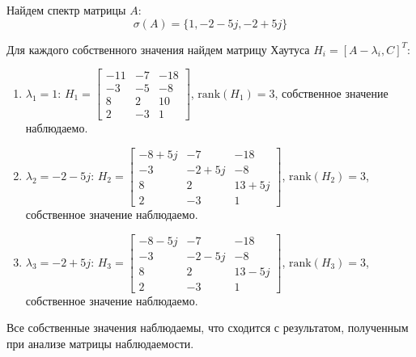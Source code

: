 Найдем спектр матрицы $A$:
\begin{equation}
    \sigma(A) = \{1, -2-5j, -2+5j\}
\end{equation}

Для каждого собственного значения найдем матрицу Хаутуса $H_i = [A - \lambda_i, C]^T$:
\begin{enumerate}
    \item $\lambda_1 = 1$: $H_1 = \begin{bmatrix}
        -11 & -7 & -18 \\
        -3 & -5 & -8 \\
        8 & 2 & 10 \\
        2 & -3 & 1
    \end{bmatrix}$, $\text{rank}(H_1) = 3$, собственное значение наблюдаемо.
    \item $\lambda_2 = -2-5j$: $H_2 = \begin{bmatrix}
        -8+5j & -7 & -18 \\
        -3 & -2+5j & -8 \\
        8 & 2 & 13+5j \\
        2 & -3 & 1
    \end{bmatrix}$, $\text{rank}(H_2) = 3$, собственное значение наблюдаемо.
    \item $\lambda_3 = -2+5j$: $H_3 = \begin{bmatrix}
        -8-5j & -7 & -18 \\
        -3 & -2-5j & -8 \\
        8 & 2 & 13-5j \\
        2 & -3 & 1
    \end{bmatrix}$, $\text{rank}(H_3) = 3$, собственное значение наблюдаемо.
\end{enumerate}
Все собственные значения наблюдаемы, что сходится с результатом, полученным при анализе матрицы наблюдаемости.

